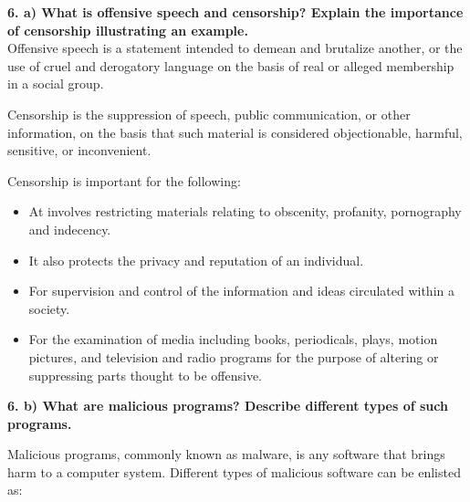 \documentclass [12pt, a4paper]{article}
\begin{document}
\large
\textbf{6. a) What is offensive speech and censorship? Explain the importance of censorship illustrating an example.}\\
\normalsize
Offensive speech is a statement intended to demean and brutalize another, or the use of cruel and derogatory language on the basis of real or alleged membership in a social group.\\
\par
Censorship is the suppression of speech, public communication, or other information, on the basis that such material is considered objectionable, harmful, sensitive, or inconvenient.\\
\par
Censorship is important for the following:
\begin{itemize}
	\item At involves restricting materials relating to obscenity, profanity, pornography and indecency.
	\item It also protects the privacy and reputation of an individual.
	\item For supervision and control of the information and ideas circulated within a society.
	\item For the examination of media including books, periodicals, plays, motion pictures, and television and radio programs for the purpose of altering or suppressing parts thought to be offensive.
\end{itemize}

\large
\textbf{6. b) What are malicious programs? Describe different types of such programs.}\\
\normalsize

Malicious programs, commonly known as malware, is any software that brings harm to a computer system. Different types of malicious software can be enlisted as:
\end{document}
